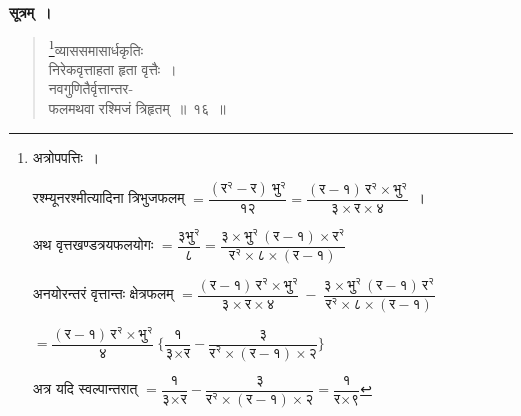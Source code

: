 \documentclass[11pt, openany]{book}
\begin{document}
 \textbf{सूत्रम्~।} 
\begin{quote}
    \bs 
    \footnote{अत्रोपपत्तिः~। 
 \vspace{1mm}

\hspace{4mm} रश्म्यूनरश्मीत्यादिना त्रिभुजफलम् $= \dfrac{(\mbox{र}^{\text{२}} - \mbox{र})~\mbox{भु}^{\text{२}}}{\mbox{१२}} = \dfrac{(\mbox{र} - \mbox{१})\,\mbox{र}^{\text{२}} \times \mbox{भु}^{\text{२}}}{\mbox{३} \times \mbox{र} \times \mbox{४}}$~। 
 \vspace{2mm}

\hspace{4mm} अथ वृत्तखण्डत्रयफलयोगः $=  \dfrac{\mbox{३भु}^{\text{२}}}{\mbox{८}} = \dfrac{\mbox{३} \times \mbox{भु}^{\text{२}}\,(\mbox{र} - \mbox{१}) \times \mbox{र}^{\text{२}}}{\mbox{र}^{\text{२}} \times \mbox{८} \times (\mbox{र} - \mbox{१})}$ 
 \vspace{2mm}

\hspace{4mm} अनयोरन्तरं वृत्तान्तः क्षेत्रफलम् $=
\dfrac{(\mbox{र} - \mbox{१})\,\mbox{र}^{\text{२}} \times \mbox{भु}^{\text{२}}}{\mbox{३} \times \mbox{र} \times \mbox{४}}\ -\ 
\dfrac{\mbox{३} \times \mbox{भु}^{\text{२}}\,(\mbox{र} - \mbox{१})\,\mbox{र}^{\text{२}}}{\mbox{र}^{\text{२}} \times \mbox{८} \times (\mbox{र} - \mbox{१})}$ 
 \vspace{2mm}

\hspace{40mm} $= \dfrac{(\mbox{र} - \mbox{१})\,\mbox{र}^{\text{२}} \times \mbox{भु}^{\text{२}}}{\mbox{४}}\ \Bigg\{\dfrac{\mbox{१}}{\mbox{३} \times \mbox{र}} - \dfrac{\mbox{३}}{\mbox{र}^{\text{२}} \times (\mbox{र} - \mbox{१}) \times \mbox{२}}\Bigg\}$ 
 \vspace{2mm}

\hspace{4mm} अत्र यदि स्वल्पान्तरात् \hspace{8mm} $= \dfrac{\mbox{१}}{\mbox{३} \times \mbox{र}} - \dfrac{\mbox{३}}{\mbox{र}^{\text{२}} \times (\mbox{र} - \mbox{१}) \times \mbox{२}} = \dfrac{\mbox{१}}{\mbox{र} \times \mbox{९}}$}व्याससमासार्धकृतिः\\
 निरेकवृत्ताहता हृता वृत्तैः~।\\
नवगुणितैर्वृत्तान्तर-\\
फलमथवा रश्मिजं त्रिहृतम्~॥~१६~॥
\end{quote}
\newpage%
\end{document}
